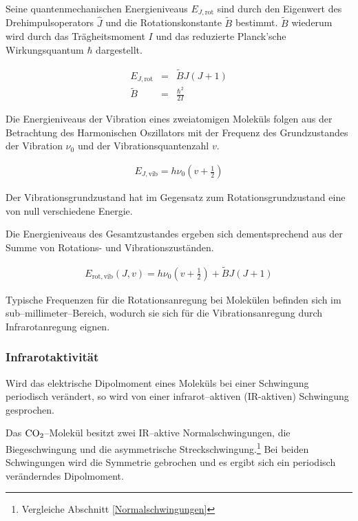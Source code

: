\documentclass[12pt,a4paper]{scrartcl}
\numberwithin{equation}{section} %
\begin{document}
Seine quantenmechanischen Energieniveaus $E_{J, \mathrm{rot}}$ sind durch den Eigenwert des Drehimpulsoperators $\hat J$ und die Rotationskonstante $\tilde{B}$ bestimmt. $\tilde{B}$  wiederum wird durch das Trägheitsmoment $I$ und das reduzierte Planck'sche Wirkungsquantum $\hbar$ dargestellt.

\begin{eqnarray}
	E_{J, \mathrm{rot}} &=& \tilde{B} J (J + 1) \\
	\tilde{B} &=& \frac{\hbar^2}{2 I}
\end{eqnarray}

\noindent
Die Energieniveaus der Vibration eines zweiatomigen Moleküls folgen aus der Betrachtung des Harmonischen Oszillators mit der Frequenz des Grundzustandes der Vibration $\nu_0$ und der Vibrationsquantenzahl $v$.

\begin{eqnarray}
	E_{J, \mathrm{vib}} = h \nu_0\left(v + \frac{1}{2}\right)
\end{eqnarray}

\noindent
Der Vibrationsgrundzustand hat im Gegensatz zum Rotationsgrundzustand eine von null verschiedene Energie.

Die Energieniveaus des Gesamtzustandes ergeben sich dementsprechend aus der Summe von Rotations- und Vibrationszuständen.

\begin{eqnarray}
	E_\mathrm{rot,vib}(J,v) = h \nu_0 \left(v + \frac{1}{2}\right) + \tilde{B} J (J + 1) \label{eq:E rot,vib}
\end{eqnarray}

\noindent
Typische Frequenzen für die Rotationsanregung bei Molekülen befinden sich im sub--millimeter--Bereich, wodurch sie sich für die Vibrationsanregung durch Infrarotanregung eignen.

\hypertarget{infrarotaktivituxe4t}{\subsubsection{Infrarotaktivität}\label{infrarotaktivituxe4t}}
Wird das elektrische Dipolmoment eines Moleküls bei einer Schwingung periodisch verändert, so wird von einer infrarot--aktiven (IR-aktiven) Schwingung gesprochen.

Das $\ce{CO_2}$--Molekül besitzt zwei  IR--aktive Normalschwingungen, die Biegeschwingung und die asymmetrische Streckschwingung.\footnote{Vergleiche Abschnitt \ref{Normalschwingungen}} Bei beiden Schwingungen wird die Symmetrie gebrochen und es ergibt sich ein periodisch veränderndes Dipolmoment.
\end{document}
